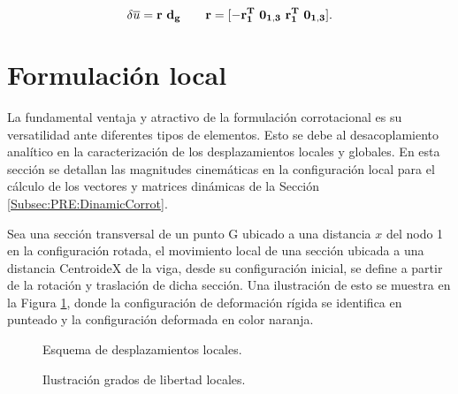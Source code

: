 \begin{equation}\label{eq:PRE:DefincionR}
\delta \overline{u} = \bf{r}~ d_g ~~~~~~\bf{r} = [ -\bf{r}_1^T~ \bf{0}_{1,3}~ \bf{r}_1^T~ \bf{0}_{1,3}  ].
\end{equation}

\section{Formulación local}\label{Sec:PRE:LocalFormul}
La fundamental ventaja y atractivo de la formulación corrotacional es su versatilidad ante diferentes tipos de elementos. Esto se debe al desacoplamiento analítico en la caracterización de los desplazamientos locales y globales. En esta sección se detallan las magnitudes cinemáticas en la configuración local para el cálculo de los vectores y matrices dinámicas de la Sección \ref{Subsec:PRE:DinamicCorrot}.

Sea una sección transversal de un punto G ubicado a una distancia $x$ del nodo 1 en la configuración rotada, el movimiento local de una sección ubicada a una distancia \gls{CentroideX} de la viga, desde su configuración inicial, se define a partir de la rotación y traslación de dicha sección. Una ilustración de esto se muestra en la Figura \ref{fig:PRE:IlusLocalDisp}, donde la configuración de deformación rígida se identifica en punteado y la configuración deformada en color naranja.



\begin{figure}[htbp]
	\centering
	\def\svgwidth{100mm}
	
	\caption{Esquema de desplazamientos locales.}
	\label{fig:PRE:IlusLocalDisp}
\end{figure}

\begin{figure}[htbp]
	\centering
	\def\svgwidth{100mm}
 	
	\caption{Ilustración grados de libertad locales.}
	\label{fig:PRE:IlusLocalAng}
\end{figure}




